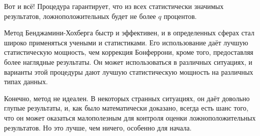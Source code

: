 Вот и всё! Процедура гарантирует, что из всех статистически значимых результатов, ложноположительных будет не более $q$ процентов.\cite{benjamini_controlling_1995}


Метод Бенджамини-Хохберга быстр и эффективен, и в определенных сферах стал широко применяться учеными и статистиками. Его использование даёт лучшую статистическую мощность, чем коррекция Бонферрони, кроме того, предоставляя более наглядные результаты. Он может использоваться в различных ситуациях, и варианты этой процедуры дают лучшую статистическую мощность на различных типах данных.

Конечно, метод не идеален. В некоторых странных ситуациях, он даёт довольно глупые результаты, и, как было математически доказано, всегда есть шанс того, что он может оказаться малополезным для контроля оценки ложноположительных результатов. Но это лучше, чем ничего, особенно для начала.

